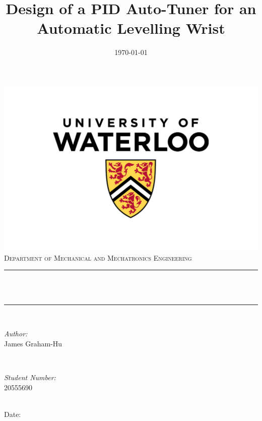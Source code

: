 \documentclass[letterpaper,12pt]{article}
\title{Design of a PID Auto-Tuner for an Automatic Levelling Wrist}
\author{}
\date{\today}											%
\makeatletter
\let\thetitle\@title
\let\thedate\@date
\makeatother
\begin{document}
\begin{titlepage}
	\centering
    \vspace*{-1 cm}
    \includegraphics[scale = 0.5]{UW.jpg}\\	%
    \textsc{\Large Department of Mechanical and Mechatronics Engineering}\\[2.0 cm]
	\rule{\linewidth}{0.2 mm} \\[0.4 cm]
	{ \huge \bfseries \thetitle}\\
	\rule{\linewidth}{0.2 mm} \\[1.5 cm]

	\begin{minipage}[t]{0.4\textwidth}
		\begin{flushleft} \large
			\emph{Author:}\\
            James Graham-Hu \\
			\end{flushleft}
			\end{minipage}~
			\begin{minipage}[t]{0.4\textwidth}
			\begin{flushright} \large
			\emph{Student Number:} \\
				20555690 \\
		\end{flushright}
	\end{minipage}\\[2 cm]
	Date:
	{\large \thedate}\\[2 cm]
	\vfill

\end{titlepage}
\thispagestyle{empty}
\thedate\\
\end{document}

